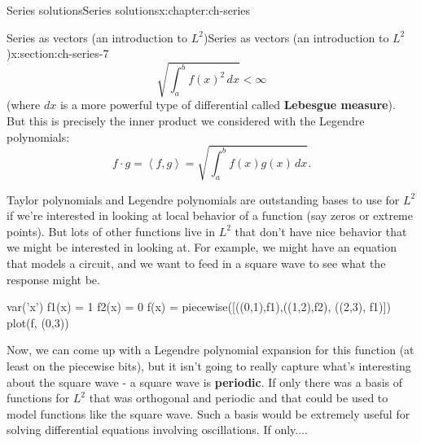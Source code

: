\documentclass[oneside,10pt,]{book}
\newcommand{\terminology}[1]{\textbf{#1}}
\numberwithin{equation}{section}
\newcommand{\ip}[2]{\left\langle #1, #2 \right\rangle}
\numberwithin{equation}{section}
\newcommand{\lt}{<}
\begin{document}
\begin{chapterptx}{Series solutions}{}{Series solutions}{}{}{x:chapter:ch-series}
\begin{sectionptx}{Series as vectors (an introduction to \(L^2\))}{}{Series as vectors (an introduction to \(L^2\))}{}{}{x:section:ch-series-7}
\begin{equation*}
\sqrt{\int_a^b f(x)^2 \, dx} \lt \infty
\end{equation*}
(where \(dx\) is a more powerful type of differential called \terminology{Lebesgue measure}). But this is precisely the inner product we considered with the Legendre polynomials:%
\begin{equation*}
f \cdot g = \ip{f}{g} = \sqrt{\int_a^b f(x)g(x) \, dx}.
\end{equation*}
%
\par
Taylor polynomials and Legendre polynomials are outstanding bases to use for \(L^2\) if we're interested in looking at local behavior of a function (say zeros or extreme points). But lots of other functions live in \(L^2\) that don't have nice behavior that we might be interested in looking at. For example, we might have an equation that models a circuit, and we want to feed in a square wave to see what the response might be.%
\begin{sageinput}
var('x')
f1(x) = 1
f2(x) = 0
f(x) = piecewise([((0,1),f1),((1,2),f2), ((2,3), f1)])
plot(f, (0,3))
\end{sageinput}
Now, we can come up with a Legendre polynomial expansion for this function (at least on the piecewise bits), but it isn't going to really capture what's interesting about the square wave - a square wave is \terminology{periodic}. If only there was a basis of functions for \(L^2\) that was orthogonal and periodic and that could be used to model functions like the square wave. Such a basis would be extremely useful for solving differential equations involving oscillations. If only....%
\end{sectionptx}
\end{chapterptx}
%
%
\typeout{************************************************}
\typeout{************************************************}
%
\end{document}
